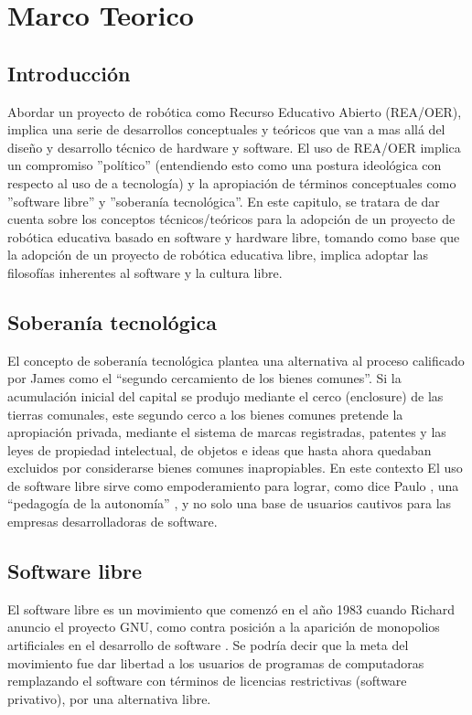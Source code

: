 
\chapter{Marco Teorico}

\section{Introducción}

Abordar un proyecto de robótica como Recurso Educativo Abierto (REA/OER), implica una serie de desarrollos conceptuales y teóricos que van a mas allá del diseño y desarrollo técnico de hardware y software. El uso de REA/OER \citep{montoya2012recursos} implica un compromiso ''político'' (entendiendo esto como una postura ideológica con respecto al uso de a tecnología) y la apropiación de términos conceptuales como ''software libre'' y ''soberanía tecnológica''. En este capitulo, se tratara de dar cuenta sobre los conceptos técnicos/teóricos para  la adopción de un proyecto de robótica educativa basado en software y hardware libre, tomando como base que la adopción de un proyecto de robótica educativa libre, implica adoptar las filosofías inherentes al software y la cultura libre.

\section{Soberanía tecnológica}

El concepto de soberanía tecnológica plantea una alternativa al proceso calificado por James \citet{boyle_second_2003} como el “segundo cercamiento de los bienes comunes”. Si la acumulación inicial del capital se produjo mediante el cerco (enclosure) de las tierras comunales, este segundo cerco a los bienes comunes pretende la apropiación privada, mediante el sistema de marcas registradas, patentes y las leyes de propiedad intelectual, de objetos e ideas que hasta ahora quedaban excluidos por considerarse bienes comunes inapropiables. En este contexto El uso de software libre sirve como empoderamiento para lograr, como dice Paulo \citet{freire_pedagogiautonomi:_2006}, una “pedagogía de la autonomía” , y no solo una base de usuarios cautivos para las empresas desarrolladoras de software. 

\section{Software libre}

El software libre es un movimiento que comenzó en el año 1983 cuando Richard \cite{stallman_software_2007} anuncio el proyecto GNU, como contra posición a la aparición de monopolios artificiales en el desarrollo de software \citep{beatriz_busaniche_argentina_2010}. Se podría decir que la meta del movimiento fue dar libertad a los usuarios de programas de computadoras remplazando el software con términos de licencias restrictivas (software privativo),  por una alternativa libre.

